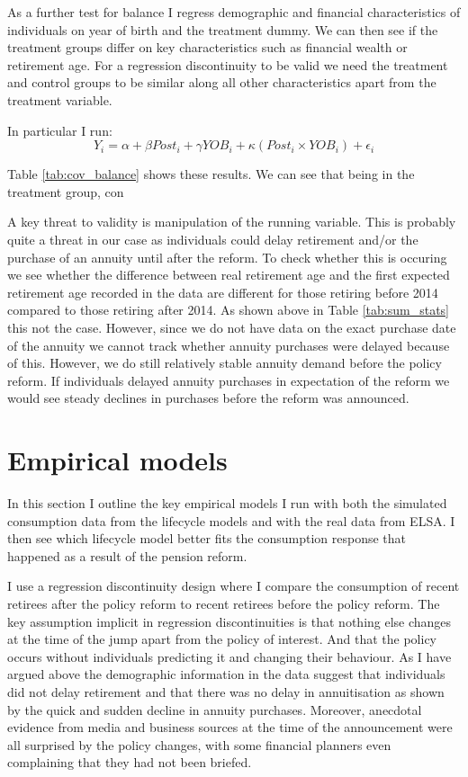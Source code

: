 \documentclass[12pt]{article}
\begin{document}
As a further test for balance I regress demographic and financial characteristics of individuals on year of birth and the treatment dummy.
We can then see if the treatment groups differ on key characteristics such as financial wealth or retirement age.
For a regression discontinuity to be valid we need the treatment and control groups to be similar along
all other characteristics apart from the treatment variable.

In particular I run:
\begin{equation*}
  Y_{i} = \alpha + \beta Post_{i} + \gamma YOB_{i} + \kappa (Post_{i} \times YOB_{i}) + \epsilon_{i}
\end{equation*}



Table \ref{tab:cov_balance} shows these results. We can see that being in the treatment group, con


A key threat to validity is manipulation of the running variable. This is probably quite a threat in our case
as individuals could delay retirement and/or the purchase of an annuity until after the reform. To check whether
this is occuring we see whether the difference between real retirement age and the first expected retirement age
recorded in the data are different for those retiring before 2014 compared to those retiring after 2014. As shown
above in Table \ref{tab:sum_stats} this not the case. However, since we do not have data on the exact purchase
date of the annuity we cannot track whether annuity purchases were delayed because of this. However, we do still
relatively stable annuity demand before the policy reform. If individuals delayed annuity purchases in expectation
of the reform we would see steady declines in purchases before the reform was announced.


\section{Empirical models}

In this section I outline the key empirical models I run with both the simulated consumption data from the
lifecycle models and with the real data from ELSA. I then see which lifecycle model better fits the consumption
response that happened as a result of the pension reform.

I use a regression discontinuity design where I compare the consumption of recent retirees after the policy reform
to recent retirees before the policy reform. The key assumption implicit in regression discontinuities is
that nothing else changes at the time of the jump apart from the policy of interest. And that the policy occurs
without individuals predicting it and changing their behaviour. As I have argued above the demographic information in the
data suggest that individuals did not delay retirement and that there was no delay in annuitisation as shown by the quick
and sudden decline in annuity purchases. Moreover, anecdotal evidence from media and business sources at the time of the
announcement were all surprised by the policy changes, with some financial planners even complaining that they had not been
briefed.
\end{document}
